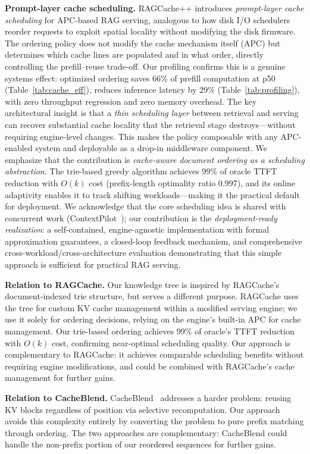 \documentclass{article}
\begin{document}
\textbf{Prompt-layer cache scheduling.}
RAGCache++ introduces \emph{prompt-layer cache scheduling} for APC-based RAG serving, analogous to how disk I/O schedulers reorder requests to exploit spatial locality without modifying the disk firmware. The ordering policy does not modify the cache mechanism itself (APC) but determines which cache lines are populated and in what order, directly controlling the prefill--reuse trade-off. Our profiling confirms this is a genuine systems effect: optimized ordering saves 66\% of prefill computation at p50 (Table~\ref{tab:cache_eff}), reduces inference latency by 29\% (Table~\ref{tab:profiling}), with zero throughput regression and zero memory overhead. The key architectural insight is that a \emph{thin scheduling layer} between retrieval and serving can recover substantial cache locality that the retrieval stage destroys---without requiring engine-level changes. This makes the policy composable with any APC-enabled system and deployable as a drop-in middleware component.
We emphasize that the contribution is \emph{cache-aware document ordering as a scheduling abstraction}. The trie-based greedy algorithm achieves 99\% of oracle TTFT reduction with $O(k)$ cost (prefix-length optimality ratio 0.997), and its online adaptivity enables it to track shifting workloads---making it the practical default for deployment.
We acknowledge that the core scheduling idea is shared with concurrent work (ContextPilot~\citep{contextpilot2025}); our contribution is the \emph{deployment-ready realization}: a self-contained, engine-agnostic implementation with formal approximation guarantees, a closed-loop feedback mechanism, and comprehensive cross-workload/cross-architecture evaluation demonstrating that this simple approach is sufficient for practical RAG serving.

\textbf{Relation to RAGCache.} Our knowledge tree is inspired by RAGCache's~\citep{jin2025ragcache} document-indexed trie structure, but serves a different purpose. RAGCache uses the tree for custom KV cache management within a modified serving engine; we use it solely for ordering decisions, relying on the engine's built-in APC for cache management. Our trie-based ordering achieves 99\% of oracle's TTFT reduction with $O(k)$ cost, confirming near-optimal scheduling quality. Our approach is complementary to RAGCache: it achieves comparable scheduling benefits without requiring engine modifications, and could be combined with RAGCache's cache management for further gains.

\textbf{Relation to CacheBlend.} CacheBlend~\citep{yao2025cacheblend} addresses a harder problem: reusing KV blocks regardless of position via selective recomputation. Our approach avoids this complexity entirely by converting the problem to pure prefix matching through ordering. The two approaches are complementary: CacheBlend could handle the non-prefix portion of our reordered sequences for further gains.
\end{document}
